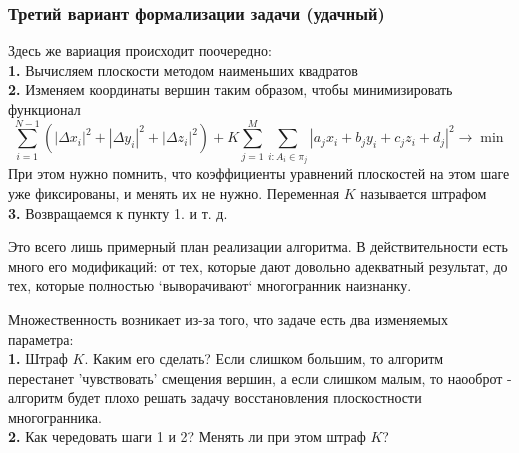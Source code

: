 \documentclass[a4paper,12pt, titlepage]{article}
\begin{document}
\subsubsection{Третий вариант формализации задачи (удачный)}
\begin{flushleft}
Здесь же вариация происходит поочередно:\\
	\textbf{1. }Вычисляем плоскости методом наименьших квадратов\\
	\textbf{2. }Изменяем координаты вершин таким образом, чтобы минимизировать функционал\\
$$	
	\sum\limits_{i = 1}^{N - 1}(|\Delta x_{i}|^{2} + |\Delta y_{i}|^{2} + |\Delta z_{i}|^{2}) + 
	K\sum\limits_{j = 1}^{M}\sum\limits_{i: A_{i} \in \pi_{j}}
	|a_{j}x_{i} + b_{j}y_{i} + c_{j}z_{i} + d_{j}|^{2} \to \min		
$$
При этом нужно помнить, что коэффициенты уравнений плоскостей на этом шаге уже фиксированы, и менять
их не нужно. Переменная $K$ называется штрафом\\
	\textbf{3. }Возвращаемся к пункту 1. и т. д.\\
\end{flushleft}
\begin{flushleft}
Это всего лишь примерный план реализации алгоритма. В действительности есть много его модификаций: от
тех, которые дают довольно адекватный результат, до тех, которые полностью `выворачивают` многогранник 
наизнанку. 
\end{flushleft}
\begin{flushleft}
Множественность возникает из-за того, что задаче есть два изменяемых параметра:\\
	\textbf{1. }Штраф $K$. Каким его сделать? Если слишком большим, то алгоритм перестанет 
'чувствовать' смещения вершин, а если слишком малым, то наооброт - алгоритм будет плохо решать задачу
восстановления плоскостности многогранника.\\
	\textbf{2. }Как чередовать шаги 1 и 2? Менять ли при этом штраф $K$?
\end{flushleft}
\end{document}
